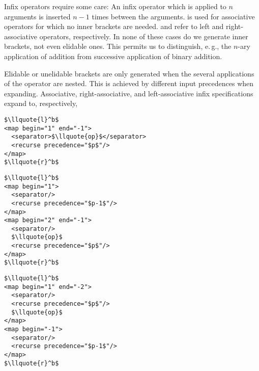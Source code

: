 
Infix operators require some care: An infix operator which is applied to $n$ arguments is
inserted $n-1$ times between the arguments. {} is used for
associative operators for which no inner brackets are needed.
{} and {} refer to left and
right-associative operators, respectively. In none of these cases do we generate inner
brackets, not even elidable ones. This permits us to distinguish, e.\,g., the $n$-ary
application of addition from successive application of binary addition.

Elidable or unelidable brackets are only generated when the several applications of the
operator are nested. This is achieved by different input precedences when
expanding. Associative, right-associative, and left-associative infix specifications
expand to, respectively,
\begin{center}
\begin{minipage}{.3\textwidth}
\begin{lstlisting}[mathescape,frame=tlrb,numbers=none]
$\llquote{l}^b$
<map begin="1" end="-1">
  <separator>$\llquote{op}$</separator>
  <recurse precedence="$p$"/>
</map>
$\llquote{r}^b$
\end{lstlisting}
\end{minipage}
\quad
\begin{minipage}{.3\textwidth}
\begin{lstlisting}[mathescape,frame=tlrb,numbers=none]
$\llquote{l}^b$
<map begin="1">
  <separator/>
  <recurse precedence="$p-1$"/>
</map>
<map begin="2" end="-1">
  <separator/>
  $\llquote{op}$
  <recurse precedence="$p$"/>
</map>
$\llquote{r}^b$
\end{lstlisting}
\end{minipage}
\quad
\begin{minipage}{.3\textwidth}
\begin{lstlisting}[mathescape,frame=tlrb,numbers=none]
$\llquote{l}^b$
<map begin="1" end="-2">
  <separator/>
  <recurse precedence="$p$"/>
  $\llquote{op}$
</map>
<map begin="-1">
  <separator/>
  <recurse precedence="$p-1$"/>
</map>
$\llquote{r}^b$
\end{lstlisting}
\end{minipage}
\end{center}

